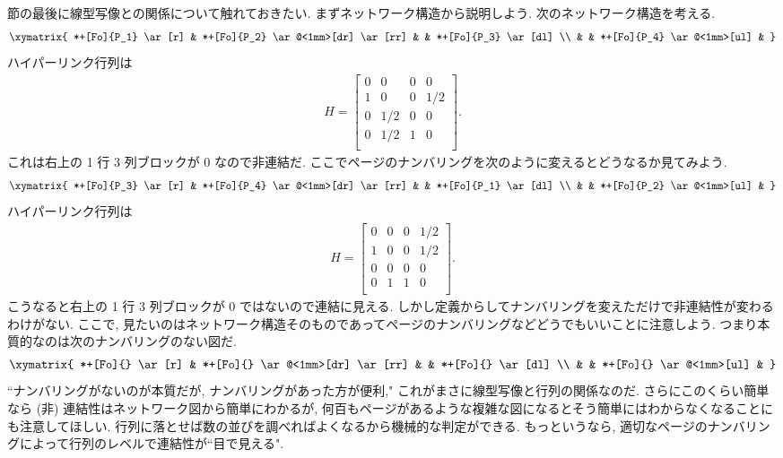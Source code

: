 \documentclass[openany, a4paper, oneside]{jsbook}
\begin{document}
節の最後に線型写像との関係について触れておきたい.
まずネットワーク構造から説明しよう.
次のネットワーク構造を考える.
\begin{align}
 \xymatrix{
  *+[Fo]{P_1} \ar[r] & *+[Fo]{P_2} \ar@<1mm>[dr] \ar[rr] &                           & *+[Fo]{P_3} \ar[dl] \\
                     &                                   & *+[Fo]{P_4} \ar@<1mm>[ul] &
 }
\end{align}
ハイパーリンク行列は
\begin{align}
 H
 =
 \begin{bmatrix}
  0 & 0   & 0 & 0 \\
  1 & 0   & 0 & 1/2 \\
  0 & 1/2 & 0 & 0 \\
  0 & 1/2 & 1 & 0 \\
 \end{bmatrix}.
\end{align}
これは右上の 1 行 3 列ブロックが 0 なので非連結だ.
ここでページのナンバリングを次のように変えるとどうなるか見てみよう.
\begin{align}
 \xymatrix{
  *+[Fo]{P_3} \ar[r] & *+[Fo]{P_4} \ar@<1mm>[dr] \ar[rr] &                           & *+[Fo]{P_1} \ar[dl] \\
                     &                                   & *+[Fo]{P_2} \ar@<1mm>[ul] &
 }
\end{align}
ハイパーリンク行列は
\begin{align}
 H
 =
 \begin{bmatrix}
  0 & 0 & 0 & 1/2 \\
  1 & 0 & 0 & 1/2 \\
  0 & 0 & 0 & 0   \\
  0 & 1 & 1 & 0   \\
 \end{bmatrix}.
\end{align}
こうなると右上の 1 行 3 列ブロックが 0 ではないので連結に見える.
しかし定義からしてナンバリングを変えただけで非連結性が変わるわけがない.
ここで, 見たいのはネットワーク構造そのものであってページのナンバリングなどどうでもいいことに注意しよう.
つまり本質的なのは次のナンバリングのない図だ.
\begin{align}
 \xymatrix{
  *+[Fo]{} \ar[r] & *+[Fo]{} \ar@<1mm>[dr] \ar[rr] &                        & *+[Fo]{} \ar[dl] \\
                  &                                & *+[Fo]{} \ar@<1mm>[ul] &
 }
\end{align}
``ナンバリングがないのが本質だが, ナンバリングがあった方が便利," これがまさに線型写像と行列の関係なのだ.
さらにこのくらい簡単なら (非) 連結性はネットワーク図から簡単にわかるが,
何百もページがあるような複雑な図になるとそう簡単にはわからなくなることにも注意してほしい.
行列に落とせば数の並びを調べればよくなるから機械的な判定ができる.
もっというなら, 適切なページのナンバリングによって行列のレベルで連結性が``目で見える".
\end{document}
